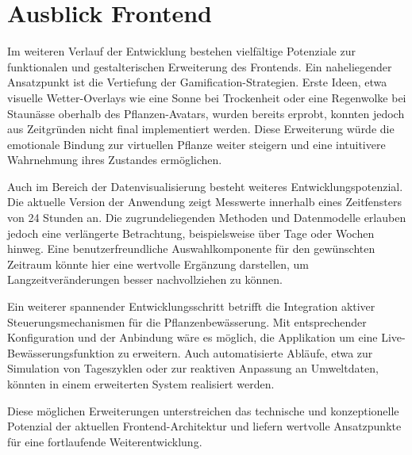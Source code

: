 \section{Ausblick Frontend}

Im weiteren Verlauf der Entwicklung bestehen vielfältige Potenziale zur funktionalen und gestalterischen Erweiterung des Frontends. Ein naheliegender Ansatzpunkt ist die Vertiefung der Gamification-Strategien. Erste Ideen, etwa visuelle Wetter-Overlays wie eine Sonne bei Trockenheit oder eine Regenwolke bei Staunässe oberhalb des Pflanzen-Avatars, wurden bereits erprobt, konnten jedoch aus Zeitgründen nicht final implementiert werden. Diese Erweiterung würde die emotionale Bindung zur virtuellen Pflanze weiter steigern und eine intuitivere Wahrnehmung ihres Zustandes ermöglichen.

Auch im Bereich der Datenvisualisierung besteht weiteres Entwicklungspotenzial. Die aktuelle Version der Anwendung zeigt Messwerte innerhalb eines Zeitfensters von 24 Stunden an. Die zugrundeliegenden Methoden und Datenmodelle erlauben jedoch eine verlängerte Betrachtung, beispielsweise über Tage oder Wochen hinweg. Eine benutzerfreundliche Auswahlkomponente für den gewünschten Zeitraum könnte hier eine wertvolle Ergänzung darstellen, um Langzeitveränderungen besser nachvollziehen zu können.

Ein weiterer spannender Entwicklungsschritt betrifft die Integration aktiver Steuerungsmechanismen für die Pflanzenbewässerung. Mit entsprechender Konfiguration und der Anbindung wäre es möglich, die Applikation um eine Live-Bewässerungsfunktion zu erweitern. Auch automatisierte Abläufe, etwa zur Simulation von Tageszyklen oder zur reaktiven Anpassung an Umweltdaten, könnten in einem erweiterten System realisiert werden.

Diese möglichen Erweiterungen unterstreichen das technische und konzeptionelle Potenzial der aktuellen Frontend-Architektur und liefern wertvolle Ansatzpunkte für eine fortlaufende Weiterentwicklung.

